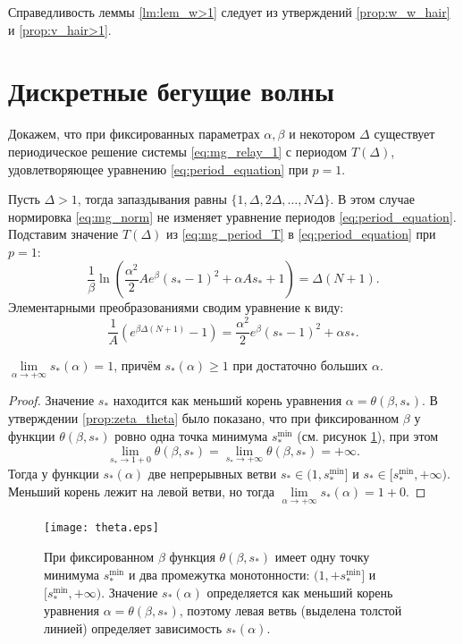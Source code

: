 Справедливость леммы \ref{lm:lem_w>1} следует из утверждений \ref{prop:w_w_hair} и \ref{prop:v_hair>1}.

\section{Дискретные бегущие волны}\label{sec:ch2/sect3}

Докажем, что при фиксированных параметрах $\alpha, \beta$ и некотором $\Delta$ существует периодическое решение системы \eqref{eq:mg_relay_1} с периодом $T(\Delta)$, удовлетворяющее уравнению \eqref{eq:period_equation} при $p = 1$.

Пусть $\Delta > 1$, тогда запаздывания равны $\{1, \Delta, 2\Delta, \ldots, N\Delta\}$. В этом случае нормировка \eqref{eq:mg_norm} не изменяет уравнение периодов \eqref{eq:period_equation}.  Подставим значение $T(\Delta)$ из \eqref{eq:mg_period_T} в \eqref{eq:period_equation} при $p = 1$:
%
\begin{equation}
	\label{eq:period_eq}
	\dfrac{1}{\beta}\ln\left( \frac{\alpha^2}{2}Ae^{\beta}( s_*-1)^2+\alpha A s_* + 1\right) = \Delta (N + 1).
\end{equation}
%
Элементарными преобразованиями сводим уравнение к виду:
\begin{equation}
	\label{eq:period_eq_exp}
	\dfrac{1}{A}\left(e^{\beta\Delta(N + 1)} - 1\right) = \dfrac{\alpha^2}{2}e^{\beta}( s_* - 1)^2 + \alpha s_*.
\end{equation}

\begin{proposition}
	$\lim\limits_{\alpha\to+\infty} s_*(\alpha) = 1$, причём $s_*(\alpha) \geq 1$ при достаточно больших $\alpha$.
\end{proposition}
\begin{proof}
	Значение $s_*$ находится как меньший корень уравнения $\alpha = \theta(\beta, s_*)$. В утверждении \ref{prop:zeta_theta} было показано, что при фиксированном $\beta$ у функции $\theta(\beta,  s_*)$ ровно одна точка минимума $ s_*^{\text{min}}$ (см. рисунок \ref{fig:theta_func_min}), при этом
	\begin{equation}
		\lim\limits_{s_* \to 1+0} \theta(\beta, s_*) = \lim\limits_{s_*\to +\infty} \theta(\beta,  s_*) = +\infty.
	\end{equation}
	Тогда у функции $s_*(\alpha)$ две непрерывных ветви $s_* \in (1,  s_*^{\text{min}}]$ и $ s_* \in [ s_*^{\text{min}}, +\infty)$. Меньший корень лежит на левой ветви, но тогда $\lim\limits_{\alpha\to+\infty} s_*(\alpha)= 1 + 0$.
\end{proof}
%
\begin{figure}
	\centering
	\texttt{[image: theta.eps]}
	\caption{При фиксированном $\beta$ функция $\theta(\beta,  s_*)$ имеет одну точку минимума $ s_*^{\min}$ и два промежутка монотонности: $(1, + s_*^{\min}]$ и $[ s_*^{\min}, +\infty)$. Значение $s_*(\alpha)$ определяется как меньший корень уравнения $\alpha = \theta(\beta,  s_*)$, поэтому левая ветвь (выделена толстой линией) определяет зависимость $ s_*(\alpha)$.}
	\label{fig:theta_func_min}
\end{figure}


